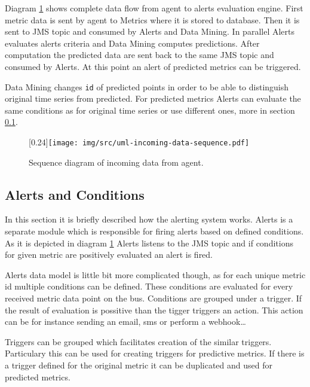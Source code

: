     Diagram \ref{img:sequence-incoming-data} shows complete data flow from agent to alerts evaluation engine.
    First metric data is sent by agent to Metrics where it is stored to database. Then it is sent to JMS topic
    and consumed by Alerts and Data Mining. In parallel Alerts evaluates alerts criteria and Data Mining computes
    predictions. After computation the predicted data are sent back to the same JMS topic and consumed by Alerts.
    At this point an alert of predicted metrics can be triggered.

    Data Mining changes \texttt{id} of predicted points in order to be able to distinguish original time series from
    predicted. For predicted metrics Alerts can evaluate the same conditions as for original time series or use
    different ones, more in section \ref{sec:alerts-conditions}.

    \begin{figure}[H]
        \begin{center}
            \scalebox{0.33}[0.24]{\texttt{[image: img/src/uml-incoming-data-sequence.pdf]}}
            \caption{Sequence diagram of incoming data from agent.}
            \label{img:sequence-incoming-data}
        \end{center}
    \end{figure}

        \subsection{Alerts and Conditions} \label{sec:alerts-conditions}
        In this section it is briefly described how the alerting system works. Alerts is a separate module
        which is responsible for firing alerts based on defined conditions. As it is depicted in diagram
        \ref{img:sequence-incoming-data} Alerts listens to the JMS topic and if conditions for given metric are
        positively evaluated an alert is fired.

        Alerts data model is little bit more complicated though, as for each unique metric id multiple conditions can be
        defined. These conditions are evaluated for every received metric data point on the bus. Conditions are
        grouped under a trigger. If the result of evaluation is possitive than the tigger triggers an action. This
        action can be for instance sending an email, sms or perform a webhook\dots

        Triggers can be grouped which facilitates creation of the similar triggers. Particulary this can be used for
        creating triggers for predictive metrics. If there is a trigger defined for the original metric it can be
        duplicated and used for predicted metrics.

